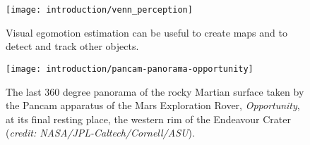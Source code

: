 \begin{wrapfigure}{r}{0.42\textwidth}
	\centering
	\texttt{[image: introduction/venn\_perception]}
	\caption{Visual egomotion estimation can be useful to create maps and to detect and track other objects.}
	\label{fig:intro_state_venn}
	\vspace{-4 em}
\end{wrapfigure}


% 
\begin{figure}
  \begin{center}
    \texttt{[image: introduction/pancam-panorama-opportunity]}
  \end{center}
  \vspace{-1em}
  \caption{The last 360 degree panorama of the rocky Martian surface taken by the Pancam apparatus of the Mars Exploration Rover, \textit{Opportunity}, at its final resting place, the western rim of the Endeavour Crater (\textit{credit: NASA/JPL-Caltech/Cornell/ASU}).}
    \label{fig:intro_endeavour_crater}
\end{figure}







